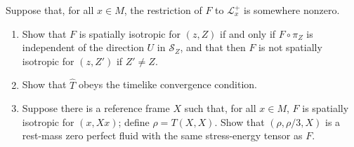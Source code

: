 Suppose that, for all $x \in M$, the restriction of $F$ to $\mathcal{L}_x^+$ is somewhere nonzero.

\begin{enumerate}
    \item[(a)] Show that $F$ is spatially isotropic for $(z, Z)$ if and only if $F \circ \pi_Z$ is independent of the direction $U$ in $\mathcal{S}_Z$, and that then $F$ is not spatially isotropic for $(z, Z')$ if $Z' \neq Z$.
    \item[(b)] Show that $\hat{T}$ obeys the timelike convergence condition.
    \item[(c)] Suppose there is a reference frame $X$ such that, for all $x \in M$, $F$ is spatially isotropic for $(x, Xx)$; define $\rho = T(X, X)$. Show that $(\rho, \rho/3, X)$ is a rest-mass zero perfect fluid with the same stress-energy tensor as $F$.
\end{enumerate}
